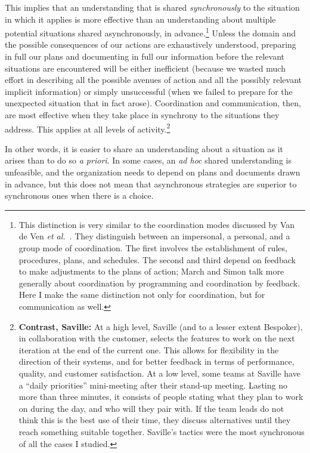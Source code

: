 This implies that an understanding that is shared \emph{synchronously} to the situation in which it applies is more effective than an understanding about multiple potential situations shared asynchronously, in advance.\footnote{This distinction is very similar to the coordination modes discussed by Van de Ven \emph{et al.}\ . They distinguish between an impersonal, a personal, and a group mode of coordination. The first involves the establishment of rules, procedures, plans, and schedules. The second and third depend on feedback to make adjustments to the plans of action; March and Simon  talk more generally about coordination by programming and coordination by feedback. Here I make the same distinction not only for coordination, but for communication as well.} Unless the domain and the possible consequences of our actions are exhaustively understood, preparing in full our plans and documenting in full our information before the relevant situations are encountered will be either inefficient (because we wasted much effort in describing all the possible avenues of action and all the possibly relevant implicit information) or simply unsuccessful (when we failed to prepare for the unexpected situation that in fact arose). Coordination and communication, then, are most effective when they take place in synchrony to the situations they address. This applies at all levels of activity.\footnote{\textbf{Contrast, Saville:} At a high level, Saville (and to a lesser extent Bespoker), in collaboration with the customer, selects the features to work on the next iteration at the end of the current one. This allows for flexibility in the direction of their systems, and for better feedback in terms of performance, quality, and customer satisfaction. At a low level, some teams at Saville have a ``daily priorities'' mini-meeting after their stand-up meeting. Lasting no more than three minutes, it consists of people stating what they plan to work on during the day, and who will they pair with. If the team leads do not think this is the best use of their time, they discuss alternatives until they reach something suitable together. Saville's tactics were the most synchronous of all the cases I studied.}

In other words, it is easier to share an understanding about a situation as it arises than to do so \emph{a priori}. In some cases, an \emph{ad hoc} shared understanding is unfeasible, and the organization needs to depend on plans and documents drawn in advance, but this does not mean that asynchronous strategies are superior to synchronous ones when there is a choice.

